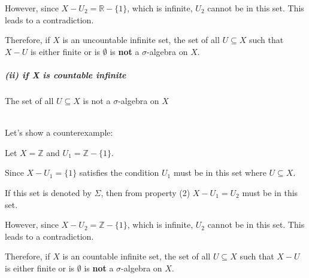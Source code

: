 \documentclass[12pt]{article}
\begin{document}
\par \hspace*{1em}However, since \( X - U_2 = \mathbb{R} - \{1\} \), which is infinite, \( U_2 \) cannot be in this set. This leads to a contradiction.\\

\par \hspace*{1em}Therefore, if \( X \) is an uncountable infinite set, the set of all \( U \subseteq X \) such that \( X - U \) is either finite or is \(\emptyset\) is \textbf{not}  a \( \sigma \)-algebra on \( X \).\\

\subparagraph{(ii) if X is countable infinite}
The set of all \( U \subseteq X \) is not a \(\sigma\)-algebra on \(X\) \\ \\
\par \hspace*{1em}Let's show a counterexample: \\
\par \hspace*{1em}Let \( X = \mathbb{Z} \) and \( U_1 = \mathbb{Z} - \{1\} \). \\
\par \hspace*{1em}Since \( X - U_1 = \{1\} \) satisfies the condition \( U_1 \) must be in this set where \( U \subseteq X \).\\
\par \hspace*{1em}If this set is denoted by \( \Sigma \), then from property (2) \( X - U_1 = U_2 \) must be in this set.\\

\par \hspace*{1em}However, since \( X - U_2 = \mathbb{Z} - \{1\} \), which is infinite, \( U_2 \) cannot be in this set. This leads to a contradiction.\\

\par \hspace*{1em}Therefore, if \( X \) is an countable infinite set, the set of all \( U \subseteq X \) such that \( X - U \) is either finite or is \(\emptyset\) is \textbf{not}  a \( \sigma \)-algebra on \( X \).\\
\end{document}
